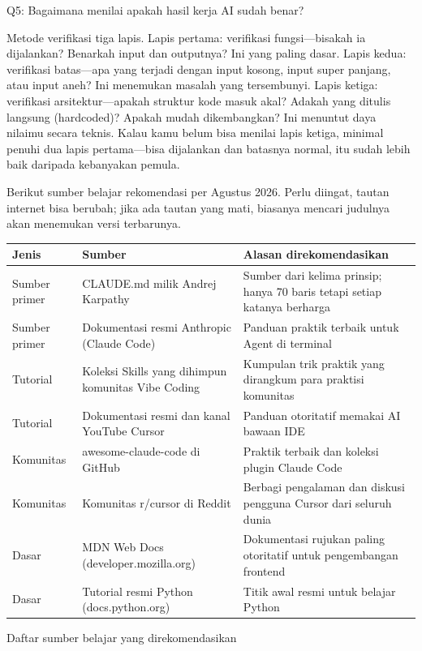 Q5: Bagaimana menilai apakah hasil kerja AI sudah benar?

Metode verifikasi tiga lapis. Lapis pertama: verifikasi fungsi—bisakah ia dijalankan? Benarkah input dan outputnya? Ini yang paling dasar. Lapis kedua: verifikasi batas—apa yang terjadi dengan input kosong, input super panjang, atau input aneh? Ini menemukan masalah yang tersembunyi. Lapis ketiga: verifikasi arsitektur—apakah struktur kode masuk akal? Adakah yang ditulis langsung (hardcoded)? Apakah mudah dikembangkan? Ini menuntut daya nilaimu secara teknis. Kalau kamu belum bisa menilai lapis ketiga, minimal penuhi dua lapis pertama—bisa dijalankan dan batasnya normal, itu sudah lebih baik daripada kebanyakan pemula.


Berikut sumber belajar rekomendasi per Agustus 2026. Perlu diingat, tautan internet bisa berubah; jika ada tautan yang mati, biasanya mencari judulnya akan menemukan versi terbarunya.

\begin{center}
\begin{tabularx}{\linewidth}{|X|X|X|}
\hline
\textbf{Jenis} & \textbf{Sumber} & \textbf{Alasan direkomendasikan} \tabularnewline
\hline
Sumber primer & CLAUDE.md milik Andrej Karpathy & Sumber dari kelima prinsip; hanya 70 baris tetapi setiap katanya berharga \tabularnewline
Sumber primer & Dokumentasi resmi Anthropic (Claude Code) & Panduan praktik terbaik untuk Agent di terminal \tabularnewline
Tutorial & Koleksi Skills yang dihimpun komunitas Vibe Coding & Kumpulan trik praktik yang dirangkum para praktisi komunitas \tabularnewline
Tutorial & Dokumentasi resmi dan kanal YouTube Cursor & Panduan otoritatif memakai AI bawaan IDE \tabularnewline
Komunitas & awesome-claude-code di GitHub & Praktik terbaik dan koleksi plugin Claude Code \tabularnewline
Komunitas & Komunitas r/cursor di Reddit & Berbagi pengalaman dan diskusi pengguna Cursor dari seluruh dunia \tabularnewline
Dasar & MDN Web Docs (developer.mozilla.org) & Dokumentasi rujukan paling otoritatif untuk pengembangan frontend \tabularnewline
Dasar & Tutorial resmi Python (docs.python.org) & Titik awal resmi untuk belajar Python \tabularnewline
\hline
\end{tabularx}
\end{center}

\begin{center}\small\color{gray}Daftar sumber belajar yang direkomendasikan\end{center}

